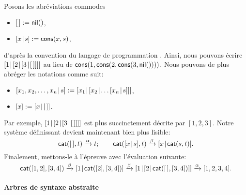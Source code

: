 Posons les abréviations commodes
\begin{itemize}

  \item \([\,] := \textsf{nil}()\),

  \item \([{x}\!\mid\!{s}] := \textsf{cons}(x,s)\),

\end{itemize}
d'après la convention du langage de programmation \Prolog
\citep{SterlingShapiro_1994,Bratko_2000}. Ainsi, nous pouvons écrire
\([{1}\!\mid\!{[{2}\!\mid\!{[{3}\!\mid\!{[\,]}]}]}]\) au lieu de
\(\textsf{cons}(1,\textsf{cons}(2,\textsf{cons}(3,\textsf{nil}())))\). Nous
pouvons de plus abréger les notations comme suit:
\begin{itemize}

  \item \(\cons{x_1,x_2,\dots,x_n}{s} := \cons{x_1}{\cons{x_2}{\dots
      \cons{x_n}{s}}}\),

  \item \([x] := [{x}\!\mid\!{[\,]}]\).

\end{itemize}
Par exemple, \([{1}\!\mid\!{[{2}\!\mid\!{[{3}\!\mid\!{[\,]}]}]}]\) est plus
succinctement décrite par \([1,2,3]\). Notre système définissant
 devient maintenant bien plus
lisible:
\begin{equation}
\fun{cat}(        \el,t) \xrightarrow{\smash{\alpha}} t;\qquad
\fun{cat}(\cons{x}{s},t) \xrightarrow{\smash{\beta}}
\cons{x}{\fun{cat}(s,t)}.
\label{def:cat}\index{pile!concaténation!définition}
\end{equation}
Finalement, mettons-le à l'épreuve avec l'évaluation suivante:
\begin{equation*}
\textsf{cat}([1,2],[3,4])
\xrightarrow{\smash{\beta}}
[{1}\!\mid\!{\textsf{cat}([2],[3,4])}]
\xrightarrow{\smash{\beta}}
[{1}\!\mid\!{[{2}\!\mid\!{\textsf{cat}([\,],[3,4])}]}]
\xrightarrow{\smash{\alpha}}
[1,2,3,4].
\end{equation*}

\paragraph{Arbres de syntaxe abstraite}

